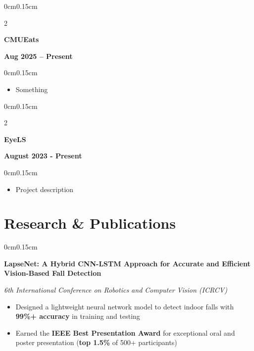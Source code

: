 \documentclass[10pt, letterpaper]{article}
\newenvironment{highlights}{
    \begin{itemize}[topsep=0pt, parsep=0pt, partopsep=0pt, itemsep=0pt, leftmargin=0.6cm]
}{
    \end{itemize}
}
\newenvironment{onecolentry}{
    \begin{adjustwidth}{0cm}{0.15cm}
}{
    \end{adjustwidth}
}
\newenvironment{twocolentry}[2][]{
    \onecolentry
    \def\secondColumn{#2}
    \setcolumnwidth{\fill, 4cm}
    \begin{paracol}{2}
}{
    \switchcolumn \raggedleft \secondColumn
    \end{paracol}
    \endonecolentry
}
\begin{document}
    \vspace{0.05cm}

    \begin{twocolentry}{\textbf{Aug 2025 -- Present}}
        \textbf{CMUEats}
    \end{twocolentry}
    \vspace{-0.15cm}
    \begin{onecolentry}
        \begin{highlights}
            \item Something
        \end{highlights}
    \end{onecolentry}

    \vspace{0.05cm}

    \begin{twocolentry}{\textbf{August 2023 - Present}}
        \textbf{EyeLS}
    \end{twocolentry}
    \vspace{-0.15cm}
    \begin{onecolentry}
        \begin{highlights}
            \item Project description
        \end{highlights}
    \end{onecolentry}

    \vspace{0.05cm}

    \section{Research \& Publications}
    \vspace{0.1cm}

    \begin{onecolentry}
        \textbf{LapseNet: A Hybrid CNN-LSTM Approach for Accurate and Efficient Vision-Based Fall Detection}
        
        \textit{6th International Conference on Robotics and Computer Vision (ICRCV)}
        \begin{highlights}
            \item Designed a lightweight neural network model to detect indoor falls with \textbf{99\%+ accuracy} in training and testing
            \item Earned the \textbf{IEEE Best Presentation Award} for exceptional oral and poster presentation (\textbf{top 1.5\%} of 500+ participants)
        \end{highlights}
    \end{onecolentry}
\end{document}
